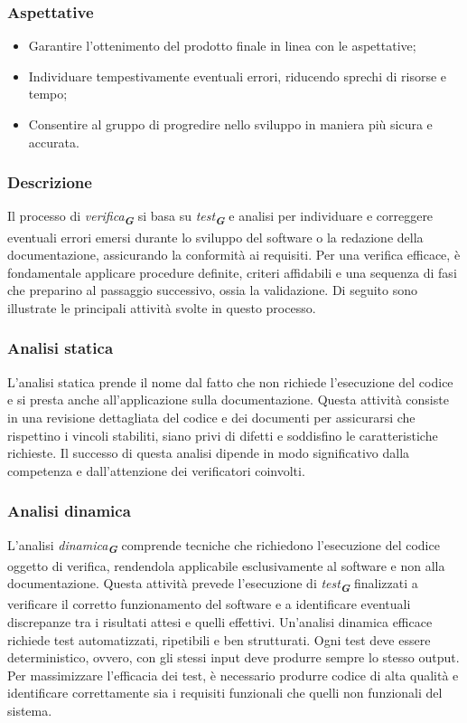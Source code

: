 \subsubsection{Aspettative}
\begin{itemize}
    \item Garantire l'ottenimento del prodotto finale in linea con le aspettative;
    \item Individuare tempestivamente eventuali errori, riducendo sprechi di risorse e tempo;
    \item Consentire al gruppo di progredire nello sviluppo in maniera più sicura e accurata.
\end{itemize}

\subsubsection{Descrizione}
Il processo di \emph{verifica}\textsubscript{\textit{\textbf{G}}} si basa su \emph{test}\textsubscript{\textit{\textbf{G}}} e analisi per individuare e correggere eventuali errori emersi durante lo sviluppo del software o la redazione della documentazione, assicurando la conformità ai requisiti. Per una verifica efficace, è fondamentale applicare procedure definite, criteri affidabili e una sequenza di fasi che preparino al passaggio successivo, ossia la validazione. Di seguito sono illustrate le principali attività svolte in questo processo.

\subsubsection{Analisi statica}
L’analisi statica prende il nome dal fatto che non richiede l’esecuzione del codice e si presta anche all’applicazione sulla documentazione. Questa attività consiste in una revisione dettagliata del codice e dei documenti per assicurarsi che rispettino i vincoli stabiliti, siano privi di difetti e soddisfino le caratteristiche richieste. Il successo di questa analisi dipende in modo significativo dalla competenza e dall’attenzione dei verificatori coinvolti.

\subsubsection{Analisi dinamica}
L’analisi \emph{dinamica}\textsubscript{\textit{\textbf{G}}} comprende tecniche che richiedono l’esecuzione del codice oggetto di verifica, rendendola applicabile esclusivamente al software e non alla documentazione. Questa attività prevede l’esecuzione di \emph{test}\textsubscript{\textit{\textbf{G}}} finalizzati a verificare il corretto funzionamento del software e a identificare eventuali discrepanze tra i risultati attesi e quelli effettivi.
Un’analisi dinamica efficace richiede test automatizzati, ripetibili e ben strutturati. Ogni test deve essere deterministico, ovvero, con gli stessi input deve produrre sempre lo stesso output. 
Per massimizzare l’efficacia dei test, è necessario produrre codice di alta qualità e identificare correttamente sia i requisiti funzionali che quelli non funzionali del sistema.


